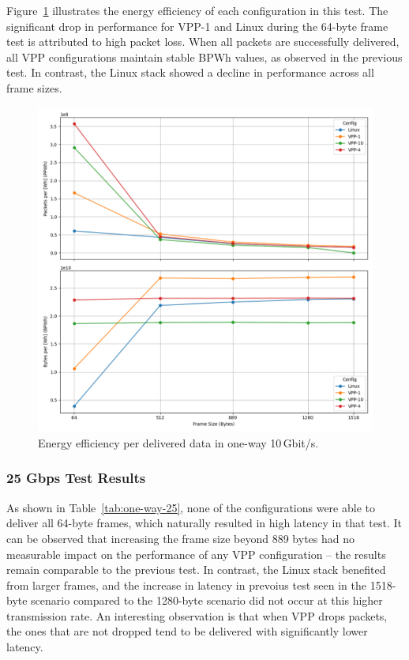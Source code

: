 Figure~\ref{fig:10g} illustrates the energy efficiency of each configuration in this test.
The significant drop in performance for VPP-1 and Linux during the 64-byte frame test is attributed to high packet loss.
When all packets are successfully delivered, all VPP configurations maintain stable BPWh values, as observed in the previous test.
In contrast, the Linux stack showed a decline in performance across all frame sizes.

\begin{figure}[!htbp]
    \centering
    \includegraphics[width=\linewidth]{images/consumption-10g.png}
    \caption{Energy efficiency per delivered data in one-way 10\,Gbit/s.}
    \label{fig:10g}
\end{figure}



\subsubsection{25 Gbps Test Results}

As shown in Table~\ref{tab:one-way-25}, none of the configurations were able to deliver all 64-byte frames, which naturally resulted in high latency in that test.
It can be observed that increasing the frame size beyond 889 bytes had no measurable impact on the performance of any VPP configuration -- the results remain comparable to the previous test.
In contrast, the Linux stack benefited from larger frames, and the increase in latency in prevoius test seen in the 1518-byte scenario compared to the 1280-byte scenario 
did not occur at this higher transmission rate.
An interesting observation is that when VPP drops packets, the ones that are not dropped tend to be delivered with significantly lower latency.

